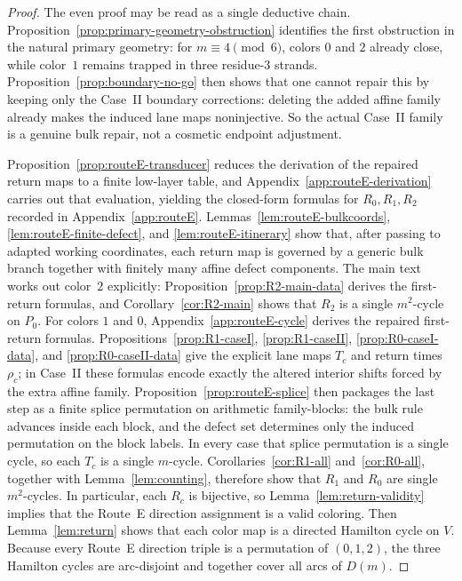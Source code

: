 \documentclass[11pt]{article}
\begin{document}
\begin{proof}
The even proof may be read as a single deductive chain.
Proposition~\ref{prop:primary-geometry-obstruction} identifies the first obstruction in the natural primary geometry: for $m\equiv 4\pmod 6$, colors $0$ and $2$ already close, while color~$1$ remains trapped in three residue-$3$ strands.
Proposition~\ref{prop:boundary-no-go} then shows that one cannot repair this by keeping only the Case~II boundary corrections: deleting the added affine family already makes the induced lane maps noninjective.
So the actual Case~II family is a genuine bulk repair, not a cosmetic endpoint adjustment.

Proposition~\ref{prop:routeE-transducer} reduces the derivation of the repaired return maps to a finite low-layer table, and Appendix~\ref{app:routeE-derivation} carries out that evaluation, yielding the closed-form formulas for $R_0,R_1,R_2$ recorded in Appendix~\ref{app:routeE}.
Lemmas~\ref{lem:routeE-bulkcoords}, \ref{lem:routeE-finite-defect}, and \ref{lem:routeE-itinerary} show that, after passing to adapted working coordinates, each return map is governed by a generic bulk branch together with finitely many affine defect components.
The main text works out color~$2$ explicitly: Proposition~\ref{prop:R2-main-data} derives the first-return formulas, and Corollary~\ref{cor:R2-main} shows that $R_2$ is a single $m^2$-cycle on $P_0$.
For colors $1$ and $0$, Appendix~\ref{app:routeE-cycle} derives the repaired first-return formulas.
Propositions~\ref{prop:R1-caseI}, \ref{prop:R1-caseII}, \ref{prop:R0-caseI-data}, and \ref{prop:R0-caseII-data} give the explicit lane maps $T_c$ and return times $\rho_c$; in Case~II these formulas encode exactly the altered interior shifts forced by the extra affine family.
Proposition~\ref{prop:routeE-splice} then packages the last step as a finite splice permutation on arithmetic family-blocks: the bulk rule advances inside each block, and the defect set determines only the induced permutation on the block labels.
In every case that splice permutation is a single cycle, so each $T_c$ is a single $m$-cycle.
Corollaries~\ref{cor:R1-all} and~\ref{cor:R0-all}, together with Lemma~\ref{lem:counting}, therefore show that $R_1$ and $R_0$ are single $m^2$-cycles.
In particular, each $R_c$ is bijective, so Lemma~\ref{lem:return-validity} implies that the Route~E direction assignment is a valid coloring.
Then Lemma~\ref{lem:return} shows that each color map is a directed Hamilton cycle on $V$.
Because every Route~E direction triple is a permutation of $(0,1,2)$, the three Hamilton cycles are arc-disjoint and together cover all arcs of $D(m)$.
\end{proof}
\end{document}
